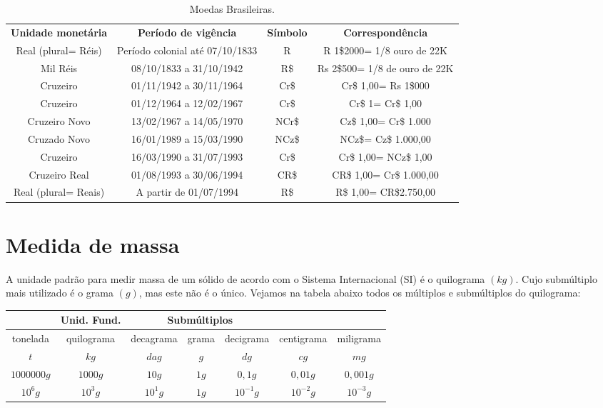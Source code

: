  \begin{table}[H]
 \centering
 \begin{tabular}{|c|c|c|c|} \hline
 \rowcolor{cinza}
 \multicolumn{4}{|c|}{\textbf{Unidades do sistema monetário Brasileiro}} \\
 \hline
 \textbf{Unidade monetária} & \textbf{Período de vigência} & \textbf{Símbolo} & \textbf{Correspondência} \\
\hline
Real (plural= Réis) & Período colonial até 07/10/1833 & R & R 1\$2000= 1/8 ouro de 22K \\
\hline
Mil Réis & 08/10/1833 a 31/10/1942 & R\$ & Rs 2\$500= 1/8 de ouro de 22K \\
\hline
Cruzeiro & 01/11/1942 a 30/11/1964 & Cr\$ & Cr\$ 1,00= Rs 1\$000 \\
\hline
Cruzeiro & 01/12/1964 a 12/02/1967 & Cr\$ & Cr\$ 1= Cr\$ 1,00 \\
\hline
Cruzeiro Novo & 13/02/1967 a 14/05/1970 & NCr\$ & Cz\$ 1,00= Cr\$ 1.000 \\
\hline
Cruzado Novo & 16/01/1989 a 15/03/1990 & NCz\$ & NCz\$= Cz\$ 1.000,00 \\ 
\hline
Cruzeiro & 16/03/1990 a 31/07/1993 & Cr\$ & Cr\$ 1,00= NCz\$ 1,00 \\
\hline
Cruzeiro Real & 01/08/1993 a 30/06/1994 & CR\$ & CR\$ 1,00= Cr\$ 1.000,00 \\
\hline
Real (plural= Reais) & A partir de 01/07/1994 & R\$ & R\$ 1,00= CR\$2.750,00 \\
\hline

\end{tabular}
\caption{Moedas Brasileiras.}
\end{table}


\section{Medida de massa}
A unidade padrão para medir massa de um sólido de acordo com o Sistema Internacional (SI) é o quilograma $(kg)$. Cujo submúltiplo mais utilizado é o grama $(g)$, mas este não é o único. Vejamos na tabela abaixo todos os múltiplos e submúltiplos do quilograma:

 \begin{table}[H]
 \centering
 \begin{tabular}{|c|c|c|c|c|c|c|} \hline
 \rowcolor{cinza}
  \multicolumn{3}{|c|}{\textbf{Múltiplos}} 
 & \multicolumn{1}{|c|}{\textbf{Unid. Fund.}} & \multicolumn{3}{|c|}{\textbf{Submúltiplos}} \\ 
 \hline
 tonelada & quilograma & decagrama & grama & decigrama & centigrama & miligrama \\ 
 \hline
 $t$ & $kg$ & $dag$ & $g$ & $dg$ & $cg$ & $mg$ \\ \hline
 $1000000 g$ & $1000 g$ & $10 g$ & $1 g$ & $0,1 g$ & $0,01 g$ & $0,001 g$ \\ \hline
 $10^6 g$ & $10^3 g$ & $10^1 g$ & $1 g$ & $10^{-1} g$ & $10^{-2} g$ & $10^{-3} g$ \\ \hline
 \end{tabular}
\end{table}



